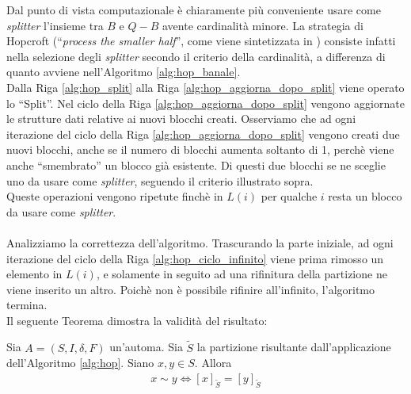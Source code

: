 Dal punto di vista computazionale è chiaramente più conveniente usare come \emph{splitter} l'insieme tra $B$ e $Q - B$ avente cardinalità minore. La strategia di Hopcroft (``\emph{process the smaller half}'', come viene sintetizzata in \cite{paigetarjan}) consiste infatti nella selezione degli \emph{splitter} secondo il criterio della cardinalità, a differenza di quanto avviene nell'Algoritmo \ref{alg:hop_banale}.\\
Dalla Riga \ref{alg:hop_split} alla Riga \ref{alg:hop_aggiorna_dopo_split} viene operato lo ``Split''. Nel ciclo della Riga \ref{alg:hop_aggiorna_dopo_split} vengono aggiornate le strutture dati relative ai nuovi blocchi creati. Osserviamo che ad ogni iterazione del ciclo della Riga \ref{alg:hop_aggiorna_dopo_split} vengono creati due nuovi blocchi, anche se il numero di blocchi aumenta soltanto di 1, perchè viene anche ``smembrato'' un blocco già esistente. Di questi due blocchi se ne sceglie uno da usare come \emph{splitter}, seguendo il criterio illustrato sopra.\\
Queste operazioni vengono ripetute finchè in $L(i)$ per qualche $i$ resta un blocco da usare come \emph{splitter}.
\\\\
Analizziamo la correttezza dell'algoritmo. Trascurando la parte iniziale, ad ogni iterazione del ciclo della Riga \ref{alg:hop_ciclo_infinito} viene prima rimosso un elemento in $L(i)$, e solamente in seguito ad una rifinitura della partizione ne viene inserito un altro. Poichè non è possibile rifinire all'infinito, l'algoritmo termina.\\
Il seguente Teorema dimostra la validità del risultato:
\begin{theorem}
    \label{teo:hop_corretto}
    Sia $A = (S,I,\delta,F)$ un'automa. Sia $\widetilde{S}$ la partizione risultante dall'applicazione dell'Algoritmo \ref{alg:hop}. Siano $x,y \in S$. Allora
    \begin{gather*}
        x \sim y \iff [x]_{\widetilde{S}} = [y]_{\widetilde{S}}
    \end{gather*}
\end{theorem}
